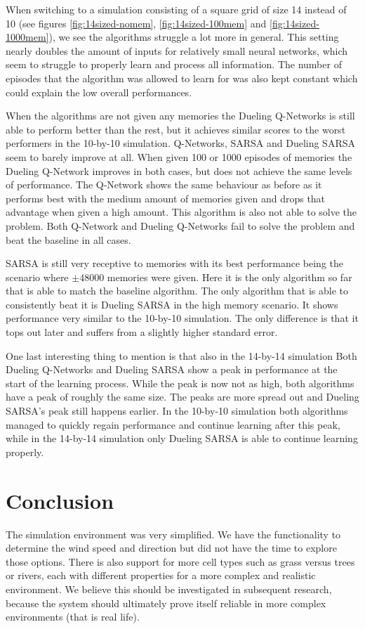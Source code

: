 When switching to a simulation consisting of a square grid of size 14 instead of 10 (see figures \ref{fig:14sized-nomem}, \ref{fig:14sized-100mem} and \ref{fig:14sized-1000mem}), we see the algorithms struggle a lot more in general. This setting nearly doubles the amount of inputs for relatively small neural networks, which seem to struggle to properly learn and process all information. The number of episodes that the algorithm was allowed to learn for was also kept constant which could explain the low overall performances.

When the algorithms are not given any memories the Dueling Q-Networks is still able to perform better than the rest, but it achieves similar scores to the worst performers in the 10-by-10 simulation. Q-Networks, SARSA and Dueling SARSA seem to barely improve at all. When given 100 or 1000 episodes of memories the Dueling Q-Network improves in both cases, but does not achieve the same levels of performance. The Q-Network shows the same behaviour as before as it performs best with the medium amount of memories given and drops that advantage when given a high amount. This algorithm is also not able to solve the problem. Both Q-Network and Dueling Q-Networks fail to solve the problem and beat the baseline in all cases.

SARSA is still very receptive to memories with its best performance being the scenario where $\pm 48000$ memories were given. Here it is the only algorithm so far that is able to match the baseline algorithm. The only algorithm that is able to consistently beat it is Dueling SARSA in the high memory scenario. It shows performance very similar to the 10-by-10 simulation. The only difference is that it tops out later and suffers from a slightly higher standard error.

One last interesting thing to mention is that also in the 14-by-14 simulation Both Dueling Q-Networks and Dueling SARSA show a peak in performance at the start of the learning process. While the peak is now not as high, both algorithms have a peak of roughly the same size. The peaks are more spread out and Dueling SARSA's peak still happens earlier. In the 10-by-10 simulation both algorithms managed to quickly regain performance and continue learning after this peak, while in the 14-by-14 simulation only Dueling SARSA is able to continue learning properly.

\section{Conclusion}\label{sec:conclusions}
The simulation environment was very simplified. We have the functionality to determine the wind speed and direction but did not have the time to explore those options. There is also support for more cell types such as grass versus trees or rivers, each with different properties for a more complex and realistic environment. We believe this should be investigated in subsequent research, because the system should ultimately prove itself reliable in more complex environments (that is real life).

